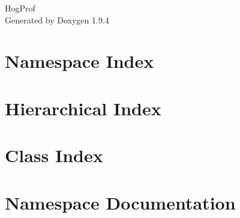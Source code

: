 \documentclass[twoside]{book}
\newcommand{\+}{\discretionary{\mbox{\scriptsize$\hookleftarrow$}}{}{}}
\newcommand{\clearemptydoublepage}{%
    \newpage{\pagestyle{empty}\cleardoublepage}%
  }
\begin{document}
  \raggedbottom
    \hypersetup{pageanchor=false,
                bookmarksnumbered=true,
                pdfencoding=unicode
               }
  \begin{titlepage}
  \vspace*{7cm}
  \begin{center}%
  {\Large Hog\+Prof}\\
  \vspace*{1cm}
  {\large Generated by Doxygen 1.9.4}\\
  \end{center}
  \end{titlepage}
  \clearemptydoublepage
  \tableofcontents
  \clearemptydoublepage
  \hypersetup{pageanchor=true}
\chapter{Namespace Index}

\chapter{Hierarchical Index}

\chapter{Class Index}

\chapter{Namespace Documentation}

\end{document}
